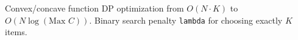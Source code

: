 
Convex/concave function DP optimization from $O(N \cdot K)$ to $O(N \log (\text{Max } C))$. Binary search penalty \lstinline|lambda| for choosing exactly $K$ items.


